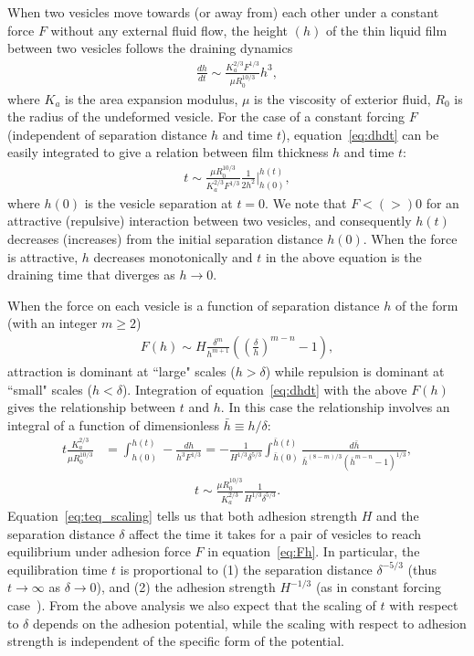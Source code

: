 \documentclass[prf,superscriptaddress,showpacs]{revtex4-1}
\begin{document}
When two vesicles move towards (or away from) each other under a
constant force $F$ without any external fluid flow, the height $(h)$ of
the thin liquid film between two vesicles follows the draining
dynamics~\cite{RamachandranLeal2010_PoF}
\begin{align}
\label{eq:dhdt}
\frac{d h}{dt} \sim \frac{K_a^{2/3} F^{1/3}}{\mu R_0^{10/3}} h^3,
\end{align}
where $K_a$ is the area expansion modulus, $\mu$ is the viscosity of
exterior fluid, $R_0$ is the radius of the undeformed vesicle.  For the
case of a constant forcing $F$ (independent of separation distance $h$
and time $t$), equation~\eqref{eq:dhdt} can be easily integrated to give
a relation between film thickness $h$ and time $t$:
\begin{align*}
t \sim \frac{\mu R_0^{10/3}}{K_a^{2/3} F^{1/3}}\frac{1}{2 h^2} \bigg|^{h(t)}_{h(0)},
\end{align*}
where $h(0)$ is the vesicle separation at $t=0$.
We note that $F< (>) 0$ for an attractive  (repulsive) interaction
between two vesicles,  and consequently $h(t)$ decreases (increases)
from  the initial separation distance $h(0)$.  When the force is
attractive, $h$ decreases monotonically and $t$ in the above equation is
the draining time that diverges as $h\rightarrow 0$.

When the force on each vesicle is a function of separation distance $h$ of the form (with an integer $m\ge 2$)
\begin{align}
\label{eq:Fh}
F(h) \sim H \frac{\delta^m}{h^{m+1}}\left(\left(\frac{\delta}{h}\right)^{m-n}-1\right),
\end{align}
attraction is dominant at ``large" scales ($h > \delta$) while repulsion
is dominant at ``small" scales ($h<\delta$).  Integration of
equation~\eqref{eq:dhdt} with the above $F(h)$ gives the relationship
between $t$ and $h$.  In this case the relationship involves an integral
of a function of dimensionless $\bar{h} \equiv h/\delta$:
\begin{align*}
t\frac{K_a^{2/3}}{\mu R_0^{10/3}}& = \int^{h(t)}_{h(0)}-\frac{dh}{h^3
  F^{1/3}} = -\frac{1}{H^{1/3}\delta^{5/3}}\int^{\bar{h}(t)}_{\bar{h}(0)}\frac{d \bar{h}}{\bar{h}^{(8-m)/3}(\bar{h}^{m-n}-1)^{1/3}},
\end{align*}
\begin{align}
\label{eq:teq_scaling}
t\sim \frac{\mu R_0^{10/3}}{K_a^{2/3}}\frac{1}{H^{1/3}\delta^{5/3}}.
\end{align}
Equation~\eqref{eq:teq_scaling} tells us that both adhesion strength $H$
and the separation distance $\delta$ affect the time it takes for a pair
of vesicles to reach equilibrium under adhesion force $F$ in
equation~\eqref{eq:Fh}.  In particular, the equilibration time $t$ is
proportional to (1) the separation distance $\delta^{-5/3}$ (thus
$t\rightarrow \infty$ as $\delta\rightarrow 0$), and (2) the adhesion
strength $H^{-1/3}$ (as in constant forcing
case~\cite{RamachandranLeal2010_PoF}).  From the above analysis we also
expect that the scaling of $t$ with respect to $\delta$ depends on the
adhesion potential, while the scaling with respect to adhesion strength
is independent of the specific form of the potential.
\end{document}
